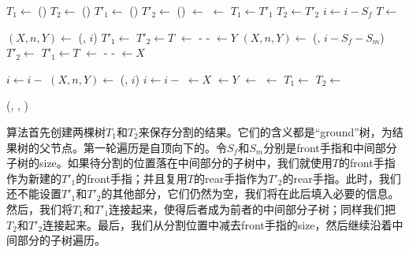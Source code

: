 \documentclass[b5paper]{ctexart}
\begin{document}
\begin{algorithmic}
  \State $T_1 \gets$ ()
  \State $T_2 \gets$ ()
   
    \State $T'_1 \gets$ ()
    \State $T'_2 \gets$ ()
    \State {} $\gets$ 
    \State {} $\gets$ 
    \State {}
    \State {}
    \State $T_1 \gets T'_1$
    \State $T_2 \gets T'_2$
    \State $i \gets i - S_f$
    \State $T \gets$ 
  \EndWhile

    \State $(X, n, Y) \gets$ (, $i$)
    \State $T'_1 \gets$ 
    \State $T'_2 \gets T$
    \State {} $\gets$  -  - 
    \State {} $\gets Y$
    \State $(X, n, Y) \gets$ (, $i - S_f - S_m$)
    \State $T'_2 \gets$ 
    \State $T'_1 \gets T$
    \State {} $\gets$  -  - 
    \State {} $\gets X$
  \EndIf
  \State {}
  \State {}

  \State $i \gets i -$ 
   
    \State $(X, n, Y) \gets$ (, $i$)
    \State $i \gets i -$ 
    \State {} $\gets X$
    \State {} $\gets Y$
    \State {} $\gets$ 
    \State {} $\gets$ 
    \State $T_1 \gets$ 
    \State $T_2 \gets$ 
  \EndWhile

  \State \Return (, , )
\EndFunction
\end{algorithmic}

算法首先创建两棵树$T_1$和$T_2$来保存分割的结果。它们的含义都是“ground”树，为结果树的父节点。第一轮遍历是自顶向下的。令$S_f$和$S_m$分别是front手指和中间部分子树的size。如果待分割的位置落在中间部分的子树中，我们就使用$T$的front手指作为新建的$T'_1$的front手指；并且复用$T$的rear手指作为$T'_2$的rear手指。此时，我们还不能设置$T'_1$和$T'_2$的其他部分，它们仍然为空，我们将在此后填入必要的信息。然后，我们将$T_1$和$T'_1$连接起来，使得后者成为前者的中间部分子树；同样我们把$T_2$和$T'_2$连接起来。最后，我们从分割位置中减去front手指的size，然后继续沿着中间部分的子树遍历。
\end{document}
